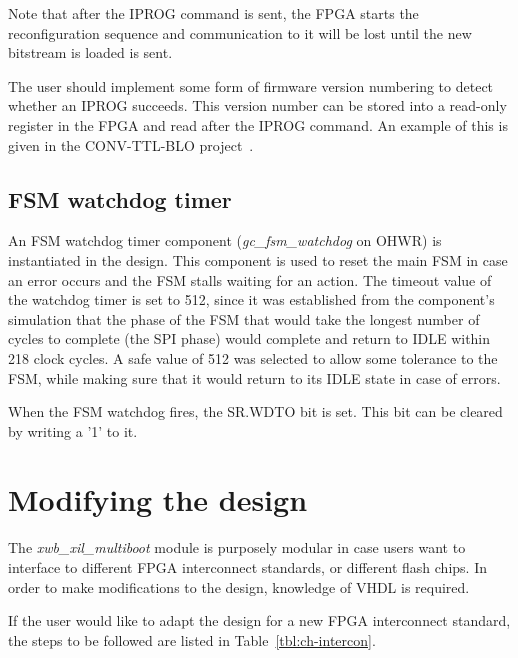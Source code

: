\documentclass[a4paper,11pt]{article}
\newcounter{rownr}
\begin{document}
Note that after the IPROG command is sent, the FPGA starts the reconfiguration
sequence and communication to it will be lost until the new bitstream is loaded
is sent.

The user should implement some form of firmware version numbering to detect whether
an IPROG succeeds. This version number can be stored into a read-only register in the
FPGA and read after the IPROG command. An example of this is given in the CONV-TTL-BLO
project~\cite{ctb-proj}.

\subsection{FSM watchdog timer}

An FSM watchdog timer component (\textit{gc\_fsm\_watchdog} on OHWR) is instantiated
in the design. This component is used to reset the main FSM in case an error
occurs and the FSM stalls waiting for an action. The timeout value of the
watchdog timer is set to 512, since it was established from the component's
simulation that the phase of the FSM that would take the longest number of
cycles to complete (the SPI phase) would complete and return to IDLE
within 218 clock cycles. A safe value of 512 was selected to allow some tolerance
to the FSM, while making sure that it would return to its IDLE state in
case of errors.

When the FSM watchdog fires, the SR.WDTO bit is set. This bit can be cleared by
writing a '1' to it.

\section{Modifying the design}
\label{sec:modify}

The \textit{xwb\_xil\_multiboot} module is purposely modular in case users want to
interface to different FPGA interconnect standards, or different flash chips.
In order to make modifications to the design, knowledge of VHDL is required.

If the user would like to adapt the design for a new FPGA interconnect standard,
the steps to be followed are listed in Table~\ref{tbl:ch-intercon}.

\setcounter{rownr}{0}
\end{document}
